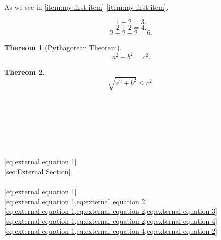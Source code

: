 \documentclass{article}
\newtheorem{theorem}{Thereom}
\begin{document}
  As we see in \ref{item:my first item} \cref{item:my first item}.

  \begin{equation}
    \label{eq:my 1st math}
    1 + 2 = 3.
  \end{equation}
  \begin{equation}
    \label{eq:my 2nd math}
    2 + 2 = 4.
  \end{equation}
  \begin{equation}
    \label{eq:my 3rd math}
    2 + 2 + 2 = 6.
  \end{equation}
  \begin{theorem}[Pythagorean Theorem]
    \label{result:my 1st theorem}
    \[ a^2 + b^2 = c^2. \]
  \end{theorem}
  \begin{theorem}
    \label{result:my 2nd theorem}
    \[ \sqrt{a^2 + b^2} \leq c^2. \]
  \end{theorem}



   \\
   \\
   \\
   \\
   \\ 
   \\ 


  \ref{eq:external equation 1}\\
  \ref{sec:External Section}\\
  \pageref{eq:external equation 1}\\


  \cref{eq:external equation 1}\\
  \cref{eq:external equation 1,eq:external equation 2}\\
  \cref{eq:external equation 1,eq:external equation 2,eq:external equation 3}\\
  \cref{eq:external equation 1,eq:external equation 2,eq:external equation 4}\\
  \cref{eq:external equation 1,eq:external equation 4,eq:external equation 2}\\
\end{document}
